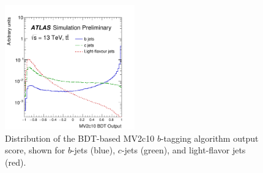 \begin{figure}[!htb]
    \begin{center}
        \includegraphics[width=0.5\textwidth]{figures/chapter3/ftag/ftag_mv2c10_disc}
        \caption{
            Distribution of the BDT-based MV2c10 $b$-tagging algorithm output score, shown for
            $b$-jets (blue), $c$-jets (green), and light-flavor jets (red).
        }
        \label{fig:ftag_mv2c10_disc}
    \end{center}
\end{figure}




\FloatBarrier
